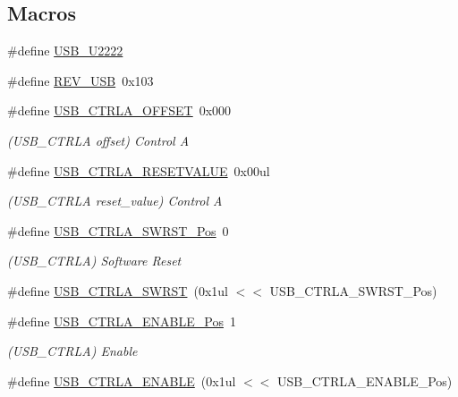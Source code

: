 \subsection*{Macros}
\begin{DoxyCompactItemize}
\item 
\#define \mbox{\hyperlink{group___s_a_m_d21___u_s_b_ga54b38e346eee20b898e2ef2a21637598}{U\+S\+B\+\_\+\+U2222}}
\item 
\#define \mbox{\hyperlink{group___s_a_m_d21___u_s_b_ga8f52971c16574d99c80af26aa4f3ab6e}{R\+E\+V\+\_\+\+U\+SB}}~0x103
\item 
\#define \mbox{\hyperlink{group___s_a_m_d21___u_s_b_ga5f5c1d5b9e987a42f466e3a04bdae965}{U\+S\+B\+\_\+\+C\+T\+R\+L\+A\+\_\+\+O\+F\+F\+S\+ET}}~0x000
\begin{DoxyCompactList}\small\item\em (U\+S\+B\+\_\+\+C\+T\+R\+LA offset) Control A \end{DoxyCompactList}\item 
\#define \mbox{\hyperlink{group___s_a_m_d21___u_s_b_gac56d29d49ee12585490772baebdd1f17}{U\+S\+B\+\_\+\+C\+T\+R\+L\+A\+\_\+\+R\+E\+S\+E\+T\+V\+A\+L\+UE}}~0x00ul
\begin{DoxyCompactList}\small\item\em (U\+S\+B\+\_\+\+C\+T\+R\+LA reset\+\_\+value) Control A \end{DoxyCompactList}\item 
\#define \mbox{\hyperlink{group___s_a_m_d21___u_s_b_ga14c38886c57df1a80b35bc7803efa91b}{U\+S\+B\+\_\+\+C\+T\+R\+L\+A\+\_\+\+S\+W\+R\+S\+T\+\_\+\+Pos}}~0
\begin{DoxyCompactList}\small\item\em (U\+S\+B\+\_\+\+C\+T\+R\+LA) Software Reset \end{DoxyCompactList}\item 
\#define \mbox{\hyperlink{group___s_a_m_d21___u_s_b_ga8f2176a471ddb65398be0fd8f2f0927b}{U\+S\+B\+\_\+\+C\+T\+R\+L\+A\+\_\+\+S\+W\+R\+ST}}~(0x1ul $<$$<$ U\+S\+B\+\_\+\+C\+T\+R\+L\+A\+\_\+\+S\+W\+R\+S\+T\+\_\+\+Pos)
\item 
\#define \mbox{\hyperlink{group___s_a_m_d21___u_s_b_ga08727ee5c4d25daaba1d0ac058be6e21}{U\+S\+B\+\_\+\+C\+T\+R\+L\+A\+\_\+\+E\+N\+A\+B\+L\+E\+\_\+\+Pos}}~1
\begin{DoxyCompactList}\small\item\em (U\+S\+B\+\_\+\+C\+T\+R\+LA) Enable \end{DoxyCompactList}\item 
\#define \mbox{\hyperlink{group___s_a_m_d21___u_s_b_ga373468d22b9b8911a2af4e52f70adb01}{U\+S\+B\+\_\+\+C\+T\+R\+L\+A\+\_\+\+E\+N\+A\+B\+LE}}~(0x1ul $<$$<$ U\+S\+B\+\_\+\+C\+T\+R\+L\+A\+\_\+\+E\+N\+A\+B\+L\+E\+\_\+\+Pos)

\end{DoxyCompactItemize}
